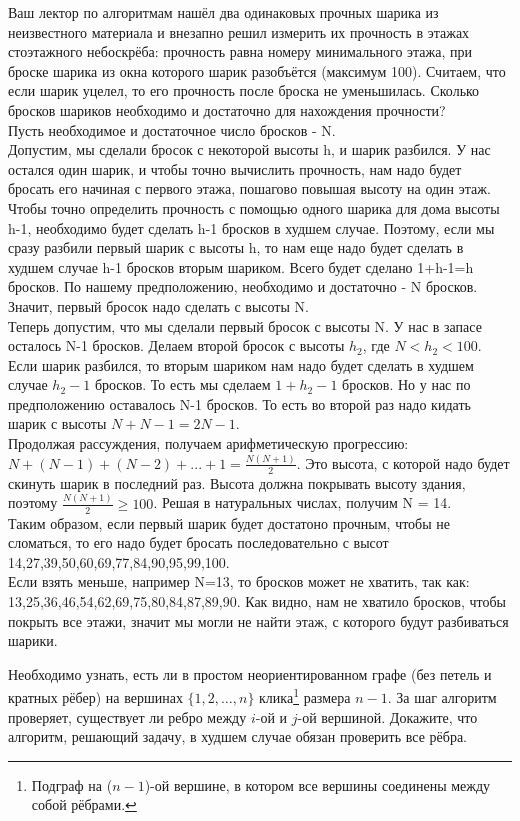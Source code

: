\documentclass[12pt]{extreport}
\theoremstyle{definiton}
\theoremstyle{definition}
\theoremstyle{definition}
\let\geq\geqslant
\newcounter{problem}
\newcounter{subproblem}
\def\beforPRskip{
	\bigskip
}
\def\prstar{\beforPRskip\noindent\stepcounter{problem}{\bf $\mathbf{\theproblem}^*$\negthickspace.}\setcounter{subproblem}{0}\;}
\begin{document}
	\prstar Ваш лектор по алгоритмам нашёл два одинаковых прочных шарика из неизвестного материала и внезапно решил измерить их прочность в этажах стоэтажного небоскрёба: прочность равна номеру минимального этажа, при броске шарика из окна которого шарик разобъётся (максимум 100). Считаем, что если шарик уцелел, то его прочность после броска не уменьшилась. Сколько бросков шариков необходимо и достаточно для нахождения прочности?
	\newline
	\\ Пусть необходимое и достаточное число бросков - N.
	\\ Допустим, мы сделали бросок с некоторой высоты h, и шарик разбился. У нас остался один шарик, и чтобы точно вычислить прочность, нам надо будет бросать его начиная с первого этажа, пошагово повышая высоту на один этаж. Чтобы точно определить прочность с помощью одного шарика для дома высоты h-1, необходимо будет сделать h-1 бросков в худшем случае. Поэтому, если мы сразу разбили первый шарик с высоты h, то нам еще надо будет сделать в худшем случае h-1 бросков вторым шариком. Всего будет сделано 1+h-1=h бросков. По нашему предположению, необходимо и достаточно - N бросков. Значит, первый бросок надо сделать с высоты N.
	\\ Теперь допустим, что мы сделали первый бросок с высоты N. У нас в запасе осталось N-1 бросков. Делаем второй бросок с высоты $h_2$, где $N < h_2 < 100$. Если шарик разбился, то вторым шариком нам надо будет сделать в худшем случае $h_2 - 1$ бросков. То есть мы сделаем $1+h_2-1$ бросков. Но у нас по предположению оставалось N-1 бросков. То есть во второй раз надо кидать шарик с высоты $N+N-1=2N-1$.
	\\ Продолжая рассуждения, получаем арифметическую прогрессию: $N+(N-1)+(N-2)+...+1=\frac{N(N+1)}{2}$. Это высота, с которой надо будет скинуть шарик в последний раз. Высота должна покрывать высоту здания, поэтому $\frac{N(N+1)}{2} \geq 100$. Решая в натуральных числах, получим N = 14.
	\\ Таким образом, если первый шарик будет достатоно прочным, чтобы не сломаться, то его надо будет бросать последовательно с высот 14,27,39,50,60,69,77,84,90,95,99,100.
	\\ Если взять меньше, например N=13, то бросков может не хватить, так как:
	\\ 13,25,36,46,54,62,69,75,80,84,87,89,90. Как видно, нам не хватило бросков, чтобы покрыть все этажи, значит мы могли не найти этаж, с которого будут разбиваться шарики.
	
	
	\prstar Необходимо узнать, есть ли в простом неориентированном графе (без петель и кратных рёбер) на вершинах $\{1,2,\ldots, n\}$ клика\footnote{Подграф на ($n-1$)-ой вершине, в котором все  вершины соединены между собой рёбрами.} размера $n-1$. За шаг алгоритм проверяет, существует ли ребро между $i$-ой и $j$-ой вершиной. Докажите, что алгоритм, решающий задачу, в худшем случае обязан проверить все рёбра. 
\end{document}
